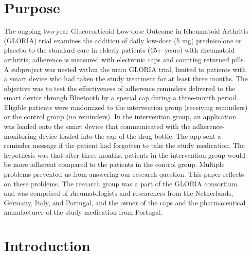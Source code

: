 \documentclass[twocolumn, issue, empirical, authordate]{jote-new-article}
\begin{document}
\section{Purpose}

 The ongoing two-year Glucocorticoid Low-dose Outcome in Rheumatoid Arthritis (GLORIA) trial examines the addition of daily low-dose (5 mg)
prednisolone or placebo to the standard care in elderly patients (65+ years) with rheumatoid arthritis; adherence is measured with electronic caps and counting returned pills. A subproject was nested within the main GLORIA trial, limited to patients with a smart device who had taken the study treatment for at least three months. The objective was to test the effectiveness of adherence reminders delivered to the smart device through Bluetooth by a special cap during a three-month period. Eligible patients were randomized to the intervention group (receiving reminders)
or the control group (no reminders). In the intervention group, an application was loaded onto the smart device that communicated with the adherence-monitoring device loaded into the cap of the drug bottle. The app sent a reminder message if the patient had forgotten to take the study medication. The hypothesis was that after three months, patients in the intervention group would be more adherent compared to the patients in the control group. Multiple problems prevented us from answering our research question. This paper reflects on these problems.
The research group was a part of the GLORIA consortium and was comprised of rheumatologists and researchers from the Netherlands, Germany, Italy, and Portugal, and the owner of the caps and the pharmaceutical manufacturer of the study medication from Portugal.


\section{Introduction}
\end{document}

